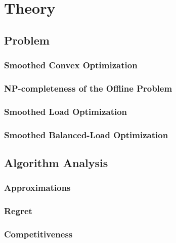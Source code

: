 
\chapter{Theory}\label{chapter:theory}

\section{Problem}

\subsection{Smoothed Convex Optimization}

\subsection{NP-completeness of the Offline Problem}

\subsection{Smoothed Load Optimization}

\subsection{Smoothed Balanced-Load Optimization}

\section{Algorithm Analysis}

\subsection{Approximations}

\subsection{Regret}

\subsection{Competitiveness}
